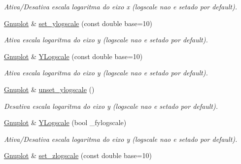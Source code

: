 \begin{DoxyCompactItemize}
\begin{DoxyCompactList}\small\item\em Ativa/\-Desativa escala logaritma do eixo x (logscale nao e setado por default). \end{DoxyCompactList}\item 
\hypertarget{classGnuplot_a201a802d2f27fece0d39809c4eb3bce0}{\hyperlink{classGnuplot}{Gnuplot} \& \hyperlink{classGnuplot_a201a802d2f27fece0d39809c4eb3bce0}{set\-\_\-ylogscale} (const double base=10)}\label{classGnuplot_a201a802d2f27fece0d39809c4eb3bce0}

\begin{DoxyCompactList}\small\item\em Ativa escala logaritma do eixo y (logscale nao e setado por default). \end{DoxyCompactList}\item 
\hypertarget{classGnuplot_ab9b5e2985c658f7791d9a49dd7008bbf}{\hyperlink{classGnuplot}{Gnuplot} \& \hyperlink{classGnuplot_ab9b5e2985c658f7791d9a49dd7008bbf}{Y\-Logscale} (const double base=10)}\label{classGnuplot_ab9b5e2985c658f7791d9a49dd7008bbf}

\begin{DoxyCompactList}\small\item\em Ativa escala logaritma do eixo y (logscale nao e setado por default). \end{DoxyCompactList}\item 
\hypertarget{classGnuplot_a74ebc96273b30c98fb9c8f047dd34ac0}{\hyperlink{classGnuplot}{Gnuplot} \& \hyperlink{classGnuplot_a74ebc96273b30c98fb9c8f047dd34ac0}{unset\-\_\-ylogscale} ()}\label{classGnuplot_a74ebc96273b30c98fb9c8f047dd34ac0}

\begin{DoxyCompactList}\small\item\em Desativa escala logaritma do eixo y (logscale nao e setado por default). \end{DoxyCompactList}\item 
\hypertarget{classGnuplot_a6ab94815fbf0fabfa108cf659079828f}{\hyperlink{classGnuplot}{Gnuplot} \& \hyperlink{classGnuplot_a6ab94815fbf0fabfa108cf659079828f}{Y\-Logscale} (bool \-\_\-fylogscale)}\label{classGnuplot_a6ab94815fbf0fabfa108cf659079828f}

\begin{DoxyCompactList}\small\item\em Ativa/\-Desativa escala logaritma do eixo y (logscale nao e setado por default). \end{DoxyCompactList}\item 
\hypertarget{classGnuplot_a1da3838163b0dbde8809b55c5b5c56b1}{\hyperlink{classGnuplot}{Gnuplot} \& \hyperlink{classGnuplot_a1da3838163b0dbde8809b55c5b5c56b1}{set\-\_\-zlogscale} (const double base=10)}\label{classGnuplot_a1da3838163b0dbde8809b55c5b5c56b1}


\end{DoxyCompactItemize}

